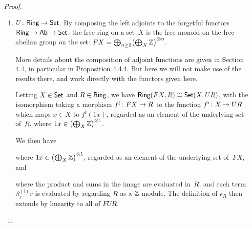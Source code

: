 \documentclass[../../solutions]{subfiles}
\begin{document}
\begin{proof}
\begin{enumerate}[label=(\roman*)]
  \item ${U}\colon{\ensuremath{\mathsf{Ring}}}\to{\ensuremath{\mathsf{Set}}}$.  By composing the left adjoints to
    the forgetful functors $\mathsf{Ring}\to \mathsf{Ab}\to \mathsf{Set}$, the free ring on a
    set~$X$ is the free monoid on the free abelian group on the set:
    $FX=\bigoplus_{n\ge0}\bigl(\bigoplus_X {\mathbb{Z}}\bigr)^{\otimes n}$.

    More details about the composition of adjoint functions are given
    in Section 4.4, in particular in Proposition 4.4.4.  But here we
    will not make use of the results there, and work directly with the
    functors given here.

    Letting $X\in\mathsf{Set}$ and $R\in\mathsf{Ring}$, we have
    $\mathsf{Ring}(FX, R)\cong \mathsf{Set}(X,UR)$, with the isomorphism taking a
    morphism ${f^\sharp}\colon{FX}\to{R}$ to the function
    ${f^\flat}\colon{X}\to{UR}$ which maps $x\in X$ to $f^\sharp(1x)$,
    regarded as an element of the underlying set of~$R$, where $1x\in
    \bigl(\bigoplus_X {\mathbb{Z}}\bigr)^{\otimes 1}$.

    We then have
    \begin{center}
    \end{center}
    where $1x\in \bigl(\bigoplus_X {\mathbb{Z}}\bigr)^{\otimes 1}$, regarded as
    an element of the underlying set of~$FX$, and
    \begin{center}
    \end{center}
    where the product and sums in the image are evaluated in~$R$, and
    each term $\beta_r^{(i)}r$ is evaluated by regarding $R$ as a
    ${\mathbb{Z}}$-module.  The definition of $\epsilon_R$ then extends by
    linearity to all of $FUR$.


\end{enumerate}
\end{proof}
\end{document}
